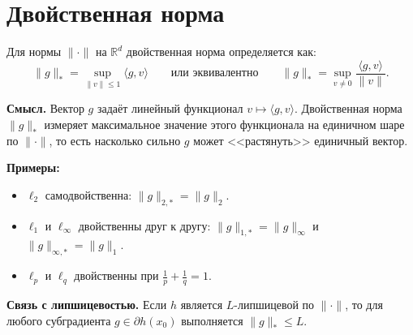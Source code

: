 \documentclass{article}
\begin{document}
\section*{Двойственная норма}

Для нормы $\|\cdot\|$ на $\mathbb{R}^d$ двойственная норма определяется как:
\[
\|g\|_* = \sup_{\|v\|\leq 1}\langle g, v\rangle
\qquad \text{или эквивалентно} \qquad
\|g\|_* = \sup_{v \neq 0} \frac{\langle g, v\rangle}{\|v\|}.
\]

\textbf{Смысл.} Вектор $g$ задаёт линейный функционал $v \mapsto \langle g, v\rangle$.
Двойственная норма $\|g\|_*$ измеряет максимальное значение этого функционала
на единичном шаре по $\|\cdot\|$, то есть насколько сильно $g$ может
<<растянуть>> единичный вектор.

\textbf{Примеры:}
\begin{itemize}
    \item $\ell_2$ самодвойственна: $\|g\|_{2,*} = \|g\|_2$.
    \item $\ell_1$ и $\ell_\infty$ двойственны друг к другу:
          $\|g\|_{1,*} = \|g\|_\infty$ и $\|g\|_{\infty,*} = \|g\|_1$.
    \item $\ell_p$ и $\ell_q$ двойственны при $\tfrac{1}{p}+\tfrac{1}{q}=1$.
\end{itemize}

\textbf{Связь с липшицевостью.} Если $h$ является $L$-липшицевой по $\|\cdot\|$,
то для любого субградиента $g \in \partial h(x_0)$ выполняется $\|g\|_* \leq L$.
\end{document}
